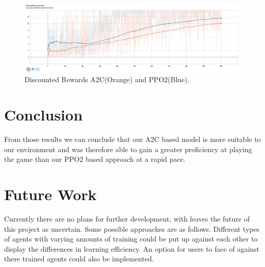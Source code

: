 \documentclass[sigconf]{acmart}
\begin{document}
\begin{figure}
 \centering
  \includegraphics[width=\textwidth]{discounted_reward} 
  \caption{Discounted Rewards A2C(Orange) and PPO2(Blue).}
  \label{fig:reward2}
\end{figure}


\vfill
\pagebreak
\section{Conclusion}
From those results we can conclude that our A2C based model is more suitable to our environment and was therefore able to gain a greater proficiency at playing the game than our PPO2 based approach at a rapid pace. 
   
\section{Future Work}
Currently there are no plans for further development, with leaves the future of  this project as uncertain. Some possible approaches are as follows. 
Different types of agents with varying amounts of training could be put up against each other to display the differences in learning efficiency. An option for users to face of against there trained agents could also be implemented.
\vfill
\pagebreak


\end{document}
